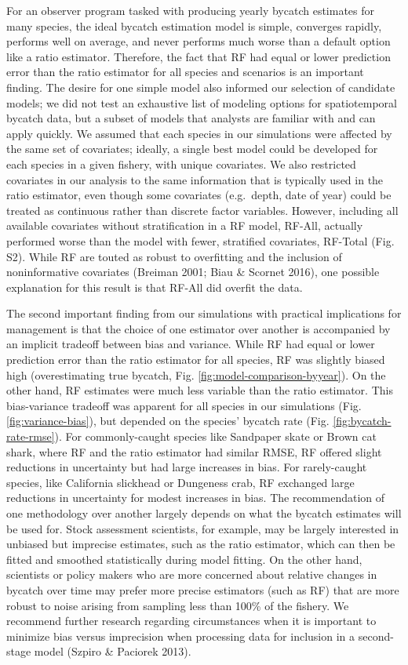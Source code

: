 \documentclass[]{article}
\begin{document}
For an observer program tasked with producing yearly bycatch estimates
for many species, the ideal bycatch estimation model is simple,
converges rapidly, performs well on average, and never performs much
worse than a default option like a ratio estimator. Therefore, the fact
that RF had equal or lower prediction error than the ratio estimator for
all species and scenarios is an important finding. The desire for one
simple model also informed our selection of candidate models; we did not
test an exhaustive list of modeling options for spatiotemporal bycatch
data, but a subset of models that analysts are familiar with and can
apply quickly. We assumed that each species in our simulations were
affected by the same set of covariates; ideally, a single best model
could be developed for each species in a given fishery, with unique
covariates. We also restricted covariates in our analysis to the same
information that is typically used in the ratio estimator, even though
some covariates (e.g.~depth, date of year) could be treated as
continuous rather than discrete factor variables. However, including all
available covariates without stratification in a RF model, RF-All,
actually performed worse than the model with fewer, stratified
covariates, RF-Total (Fig. S2). While RF are touted as robust to
overfitting and the inclusion of noninformative covariates (Breiman
2001; Biau \& Scornet 2016), one possible explanation for this result is
that RF-All did overfit the data.

The second important finding from our simulations with practical
implications for management is that the choice of one estimator over
another is accompanied by an implicit tradeoff between bias and
variance. While RF had equal or lower prediction error than the ratio
estimator for all species, RF was slightly biased high (overestimating
true bycatch, Fig. \ref{fig:model-comparison-byyear}). On the other
hand, RF estimates were much less variable than the ratio estimator.
This bias-variance tradeoff was apparent for all species in our
simulations (Fig. \ref{fig:variance-bias}), but depended on the species'
bycatch rate (Fig. \ref{fig:bycatch-rate-rmse}). For commonly-caught
species like Sandpaper skate or Brown cat shark, where RF and the ratio
estimator had similar RMSE, RF offered slight reductions in uncertainty
but had large increases in bias. For rarely-caught species, like
California slickhead or Dungeness crab, RF exchanged large reductions in
uncertainty for modest increases in bias. The recommendation of one
methodology over another largely depends on what the bycatch estimates
will be used for. Stock assessment scientists, for example, may be
largely interested in unbiased but imprecise estimates, such as the
ratio estimator, which can then be fitted and smoothed statistically
during model fitting. On the other hand, scientists or policy makers who
are more concerned about relative changes in bycatch over time may
prefer more precise estimators (such as RF) that are more robust to
noise arising from sampling less than 100\% of the fishery. We recommend
further research regarding circumstances when it is important to
minimize bias versus imprecision when processing data for inclusion in a
second-stage model (Szpiro \& Paciorek 2013).
\end{document}
